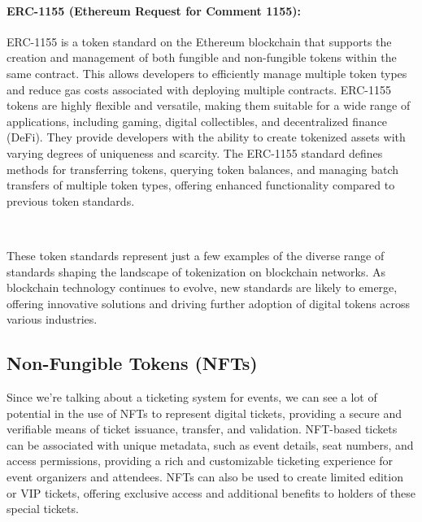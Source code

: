 \paragraph{ERC-1155 (Ethereum Request for Comment 1155):}
ERC-1155 is a token standard on the Ethereum blockchain that supports the creation and management of both fungible and non-fungible tokens within the same contract. This allows developers to efficiently manage multiple token types and reduce gas costs associated with deploying multiple contracts. ERC-1155 tokens are highly flexible and versatile, making them suitable for a wide range of applications, including gaming, digital collectibles, and decentralized finance (DeFi). They provide developers with the ability to create tokenized assets with varying degrees of uniqueness and scarcity. The ERC-1155 standard defines methods for transferring tokens, querying token balances, and managing batch transfers of multiple token types, offering enhanced functionality compared to previous token standards.

~

These token standards represent just a few examples of the diverse range of standards shaping the landscape of tokenization on blockchain networks. As blockchain technology continues to evolve, new standards are likely to emerge, offering innovative solutions and driving further adoption of digital tokens across various industries.

\subsection{Non-Fungible Tokens (NFTs)}
\label{subsec:nfts}

Since we're talking about a ticketing system for events, we can see a lot of potential in the use of NFTs to represent digital tickets, providing a secure and verifiable means of ticket issuance, transfer, and validation. NFT-based tickets can be associated with unique metadata, such as event details, seat numbers, and access permissions, providing a rich and customizable ticketing experience for event organizers and attendees. NFTs can also be used to create limited edition or VIP tickets, offering exclusive access and additional benefits to holders of these special tickets.
